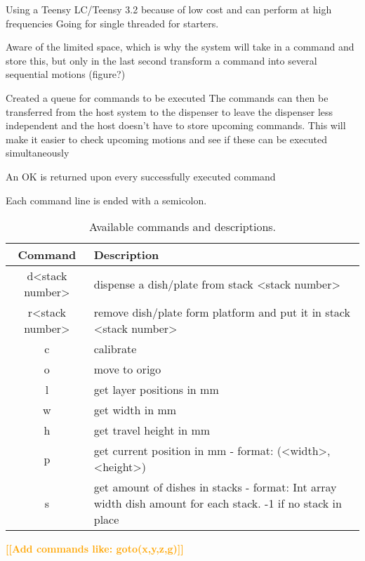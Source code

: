 \documentclass{sigchi}
\newcommand{\todo}[1]{\textsf{\textbf{\textcolor{Orange}{[[#1]]}}}}
\begin{document}
	Using a Teensy LC/Teensy 3.2 because of low cost and can perform at high frequencies
	Going for single threaded for starters.
	
	Aware of the limited space, which is why the system will take in a command and store this, but only in the last second transform a command into several sequential motions (figure?)
	
	
	
	
	Created a queue for commands to be executed
		The commands can then be transferred from the host system to the dispenser to leave the dispenser less independent and the host doesn't have to store upcoming commands.
		This will make it easier to check upcoming motions and see if these can be executed simultaneously

		An OK is returned upon every successfully executed command
		
		
	
	
	Each command line is ended with a semicolon.
	\begin{table}
	\begin{center}
	 \begin{tabular}{|| c | p{5cm} ||} 
	 \hline
	 Command & Description\\ [0.5ex] 
	 \hline\hline
	 d\textless stack number\textgreater  & dispense a dish/plate from stack \textless stack number\textgreater  \\ 
	 \hline
	 r\textless stack number\textgreater & remove dish/plate form platform and put it in stack \textless stack number\textgreater \\
	 \hline
	 c & calibrate \\
	 \hline
	 o & move to origo \\
	 \hline
	 l & get layer positions in mm \\
	 \hline
	 w & get width in mm \\
	 \hline
	 h & get travel height in mm \\ %
	 \hline
	 p & get current position in mm - format: (\textless width\textgreater ,\textless height\textgreater ) \\
	 \hline
	 s & get amount of dishes in stacks - format: Int array width dish amount for each stack. -1 if no stack in place\\ [1ex] 
	 \hline
	\end{tabular}
	\end{center}
	\caption{Available commands and descriptions.} \label{table:commands}
	\end{table}	
	\todo{Add commands like: goto(x,y,z,g)}
\end{document}
